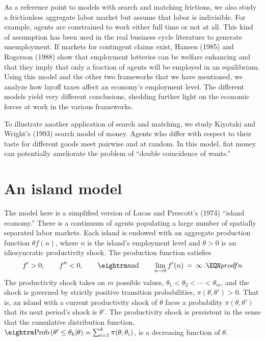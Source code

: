 As a reference point to models with search and matching frictions, we also study a
frictionless aggregate labor market but assume that labor is indivisible.  For
example, agents are constrained to work either full time or not at all.  This
kind of assumption has been used in the real business cycle literature to generate
unemployment. If markets for contingent claims exist,
Hansen (1985) and Rogerson (1988)
show that employment lotteries
%
can be welfare enhancing and that they imply that only a fraction  of agents will
be employed in an equilibrium. Using this model and the other two frameworks
that we have mentioned, we analyze how layoff taxes affect an economy's employment
level. The different models yield very different conclusions, shedding further
light on the economic forces at work in the various frameworks.

To illustrate another application of search and matching, we study Kiyotaki and
Wright's (1993) search model of money.
Agents who differ with respect to their taste for different goods meet pairwise
and at random. In this model, fiat money can potentially ameliorate the problem
of ``double coincidence of wants.''

\section{An island model}\label{sec:LucasPrescott}%
The model here is a simplified version of Lucas and
Prescott's (1974) ``island economy.''
There is a continuum of agents populating a large number of spatially separated
labor markets.  Each island is endowed with an aggregate production function
$\theta f(n)$, where $n$ is the island's employment level and $\theta>0$ is an
idiosyncratic productivity shock. The production function
satisfies
$$f'>0, \qquad f''<0, \qquad {\rm and} \qquad
               \lim_{n\to0} f'(n) \,=\, \infty\,.       \EQN prodfn
$$
The productivity shock takes on $m$ possible values,
$\theta_1 < \theta_2 < \cdots < \theta_m$, and the
shock is governed by strictly positive transition probabilities,
$\pi(\theta, \theta') > 0$. That is, an island with a current
productivity shock of $\theta$ faces a probability
$\pi(\theta, \theta')$ that its next period's shock is $\theta'$.
The productivity shock is persistent in the sense that the
cumulative distribution function,
${\rm Prob}\left(\theta' \leq \theta_k \vert \theta \right) =
\sum_{i=1}^k \pi(\theta, \theta_i)$, is a decreasing
function of $\theta$.


